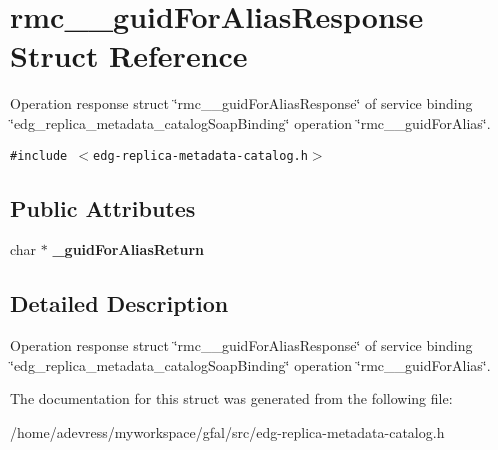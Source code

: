 \section{rmc\_\-\_\-guid\-For\-Alias\-Response Struct Reference}
\label{structrmc____guidForAliasResponse}
Operation response struct \char`\"{}rmc\_\-\_\-guid\-For\-Alias\-Response\char`\"{} of service binding \char`\"{}edg\_\-replica\_\-metadata\_\-catalog\-Soap\-Binding\char`\"{} operation \char`\"{}rmc\_\-\_\-guid\-For\-Alias\char`\"{}.  


{\tt \#include $<$edg-replica-metadata-catalog.h$>$}

\subsection*{Public Attributes}
\begin{CompactItemize}
\item 
char $\ast$ \textbf{\_\-guid\-For\-Alias\-Return}\label{structrmc____guidForAliasResponse_7430bdbfddb260640c142a3fba2a2dbe}

\end{CompactItemize}


\subsection{Detailed Description}
Operation response struct \char`\"{}rmc\_\-\_\-guid\-For\-Alias\-Response\char`\"{} of service binding \char`\"{}edg\_\-replica\_\-metadata\_\-catalog\-Soap\-Binding\char`\"{} operation \char`\"{}rmc\_\-\_\-guid\-For\-Alias\char`\"{}. 



The documentation for this struct was generated from the following file:\begin{CompactItemize}
\item 
/home/adevress/myworkspace/gfal/src/edg-replica-metadata-catalog.h\end{CompactItemize}
